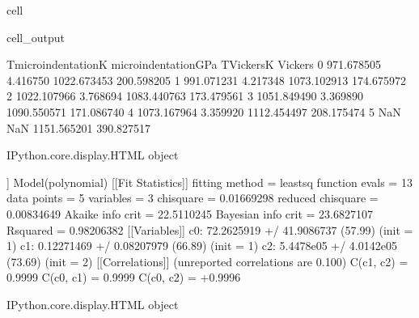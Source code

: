 \documentclass[letterpaper,10pt,english]{jupyterBook}
\begin{document}
\begin{sphinxuseclass}{cell}
\begin{sphinxVerbatimOutput}
			\begin{sphinxuseclass}{cell_output}
				\begin{sphinxVerbatim}[commandchars=\\\{\}]
					T\PYGZus{}microindentationK  microindentationGPa   T\PYGZus{}VickersK     Vickers
					0           971.678505             4.416750  1022.673453  200.598205
					1           991.071231             4.217348  1073.102913  174.675972
					2          1022.107966             3.768694  1083.440763  173.479561
					3          1051.849490             3.369890  1090.550571  171.086740
					4          1073.167964             3.359920  1112.454497  208.175474
					5                  NaN                  NaN  1151.565201  390.827517
				\end{sphinxVerbatim}
				
				\begin{sphinxVerbatim}[commandchars=\\\{\}]
					\PYGZlt{}IPython.core.display.HTML object\PYGZgt{}
				\end{sphinxVerbatim}
				
				\sphinxAtStartPar
				
				\begin{sphinxVerbatim}[commandchars=\\\{\}]
					[[Model]]
					Model(polynomial)
					[[Fit Statistics]]
					\PYGZsh{} fitting method   = leastsq
					\PYGZsh{} function evals   = 13
					\PYGZsh{} data points      = 5
					\PYGZsh{} variables        = 3
					chi\PYGZhy{}square         = 0.01669298
					reduced chi\PYGZhy{}square = 0.00834649
					Akaike info crit   = \PYGZhy{}22.5110245
					Bayesian info crit = \PYGZhy{}23.6827107
					R\PYGZhy{}squared          = 0.98206382
					[[Variables]]
					c0:  72.2625919 +/\PYGZhy{} 41.9086737 (57.99\PYGZpc{}) (init = 1)
					c1: \PYGZhy{}0.12271469 +/\PYGZhy{} 0.08207979 (66.89\PYGZpc{}) (init = 1)
					c2:  5.4478e\PYGZhy{}05 +/\PYGZhy{} 4.0142e\PYGZhy{}05 (73.69\PYGZpc{}) (init = 2)
					[[Correlations]] (unreported correlations are \PYGZlt{} 0.100)
					C(c1, c2) = \PYGZhy{}0.9999
					C(c0, c1) = \PYGZhy{}0.9999
					C(c0, c2) = +0.9996
				\end{sphinxVerbatim}
				
				\begin{sphinxVerbatim}[commandchars=\\\{\}]
					\PYGZlt{}IPython.core.display.HTML object\PYGZgt{}
				\end{sphinxVerbatim}
				

\end{sphinxuseclass}
\end{sphinxVerbatimOutput}
\end{sphinxuseclass}
\end{document}
